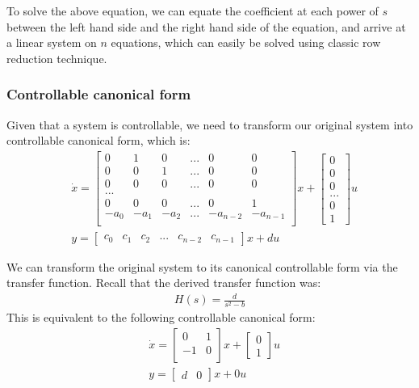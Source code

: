 \documentclass [12pt,letterpaper]{exam}
\begin{document}
To solve the above equation, we can equate the coefficient at each power of $s$ between the left hand side and the right hand side of the equation, and arrive at a linear system on $n$ equations, which can easily be solved using classic row reduction technique.

\subsubsection{Controllable canonical form}
Given that a system is controllable, we need to transform our original system into controllable canonical form, which is:
\begin{align}
& \dot{x} = \begin{bmatrix}
0 & 1 & 0 & ... & 0 & 0 \\
0 & 0 & 1 & ... & 0 & 0 \\
0 & 0 & 0 & ... & 0 & 0 \\
... \\
0 & 0 & 0 & ... & 0 & 1 \\
-a_0 & -a_1 & -a_2 & ... & -a_{n-2} & -a_{n-1} \\
\end{bmatrix} x + \begin{bmatrix}
0 \\ 0 \\ 0 \\ ... \\ 0 \\1
\end{bmatrix} u\\
& y = \begin{bmatrix}
c_0 & c_1 & c_2 & ... & c_{n-2} & c_{n-1}
\end{bmatrix} x + du
\end{align}

We can transform the original system to its canonical controllable form via the transfer function. Recall that the derived transfer function was:
\begin{align}
H(s) = \frac{d}{s^2 - b}
\end{align}
This is equivalent to the following controllable canonical form:
\begin{align}
& \dot{x} = \begin{bmatrix}
0 & 1 \\
-1 & 0 \\
\end{bmatrix} x + \begin{bmatrix}
0 \\1
\end{bmatrix} u\\
& y = \begin{bmatrix}
d & 0
\end{bmatrix} x + 0u
\end{align}
\end{document}
